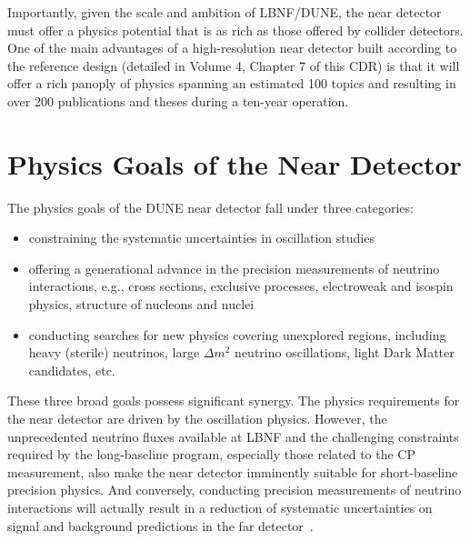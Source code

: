 


Importantly, given the scale and ambition of LBNF/DUNE, the near detector must offer a physics 
potential that is as rich as those offered by collider detectors. 
One of the main advantages of a high-resolution near detector built according to the reference design 
(detailed in Volume 4, Chapter 7 of  this CDR) is that it will offer a rich panoply of physics %
spanning an estimated 100 topics and  resulting in over 200 publications and theses during a ten-year operation. 


\section{Physics Goals of the Near Detector}
\label{sec:physics-nd-goals}

The physics goals of the DUNE near detector fall under three categories: 

\begin{itemize}
\item constraining the systematic uncertainties in  oscillation studies
\item  offering a generational advance in the precision measurements of neutrino interactions, e.g., %
cross sections, exclusive processes, electroweak and isospin physics, structure of nucleons and nuclei %
\item conducting searches for new physics covering unexplored regions, 
including heavy (sterile) neutrinos, large $\Delta m^2$ neutrino oscillations, light Dark Matter 
candidates, etc. 
\end{itemize}

These three broad goals possess significant synergy. The physics requirements for the near detector are driven 
by the oscillation physics. However,  the unprecedented neutrino fluxes available at LBNF and the challenging 
constraints required by the long-baseline program, especially those related to the CP measurement, also  make the near detector imminently suitable for  short-baseline 
precision physics. And conversely, conducting precision measurements of neutrino 
interactions will actually %
result in a reduction of systematic uncertainties on signal and background 
predictions in the far detector~\cite{HIRESMNU, DPR, Adams:2013qkq}.  


